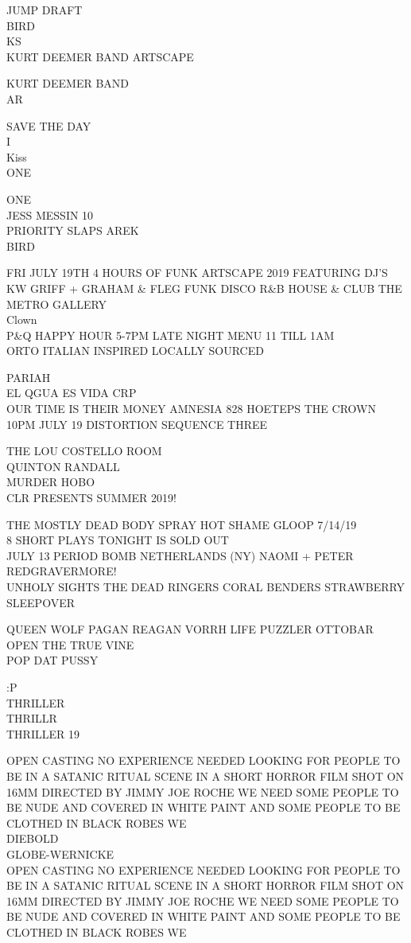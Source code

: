 \documentclass[10pt,letterpaper]{article}
\begin{document}
JUMP DRAFT\\
BIRD\\
KS\\
KURT DEEMER BAND ARTSCAPE

KURT DEEMER BAND\\
AR

SAVE THE DAY\\
I\\
Kiss\\
ONE

ONE\\
JESS MESSIN 10\\
PRIORITY SLAPS AREK\\
BIRD

FRI JULY 19TH 4 HOURS OF FUNK ARTSCAPE 2019 FEATURING DJ'S KW GRIFF + GRAHAM \& FLEG FUNK DISCO R\&B HOUSE \& CLUB THE METRO GALLERY\\
Clown\\
P\&Q HAPPY HOUR 5{-}7PM LATE NIGHT MENU 11 TILL 1AM\\
ORTO ITALIAN INSPIRED LOCALLY SOURCED

PARIAH\\
EL QGUA ES VIDA CRP\\
OUR TIME IS THEIR MONEY AMNESIA 828 HOETEPS THE CROWN 10PM JULY 19 DISTORTION SEQUENCE THREE

THE LOU COSTELLO ROOM\\
QUINTON RANDALL\\
MURDER HOBO\\
CLR PRESENTS SUMMER 2019!

THE MOSTLY DEAD BODY SPRAY HOT SHAME GLOOP 7/14/19\\
8 SHORT PLAYS TONIGHT IS SOLD OUT\\
JULY 13 PERIOD BOMB NETHERLANDS (NY) NAOMI + PETER REDGRAVERMORE!\\
UNHOLY SIGHTS THE DEAD RINGERS CORAL BENDERS STRAWBERRY SLEEPOVER

QUEEN WOLF PAGAN REAGAN VORRH LIFE PUZZLER OTTOBAR\\
OPEN THE TRUE VINE\\
POP DAT PUSSY

:P\\
THRILLER\\
THRILLR\\
THRILLER 19

OPEN CASTING NO EXPERIENCE NEEDED LOOKING FOR PEOPLE TO BE IN A SATANIC RITUAL SCENE IN A SHORT HORROR FILM SHOT ON 16MM DIRECTED BY JIMMY JOE ROCHE WE NEED SOME PEOPLE TO BE NUDE AND COVERED IN WHITE PAINT AND SOME PEOPLE TO BE CLOTHED IN BLACK ROBES WE\\
DIEBOLD\\
GLOBE{-}WERNICKE\\
OPEN CASTING NO EXPERIENCE NEEDED LOOKING FOR PEOPLE TO BE IN A SATANIC RITUAL SCENE IN A SHORT HORROR FILM SHOT ON 16MM DIRECTED BY JIMMY JOE ROCHE WE NEED SOME PEOPLE TO BE NUDE AND COVERED IN WHITE PAINT AND SOME PEOPLE TO BE CLOTHED IN BLACK ROBES WE
\end{document}
